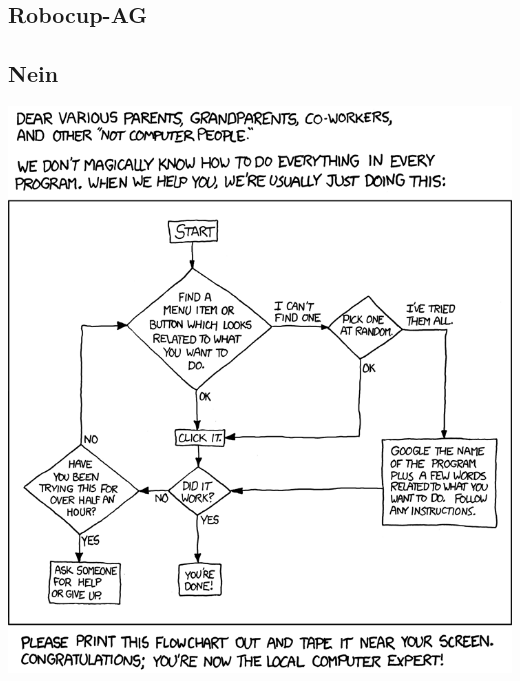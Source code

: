 \documentclass[12pt,a4paper]{scrartcl}
\begin{document}
	\subsection{Robocup-AG}
    
    \newpage
    \subsection{Nein}
    \includegraphics[width=\textwidth]{comics/tech_support_cheat_sheet.png}
    
    \newpage
    \label{fachschaftsarbeit}
\end{document}
